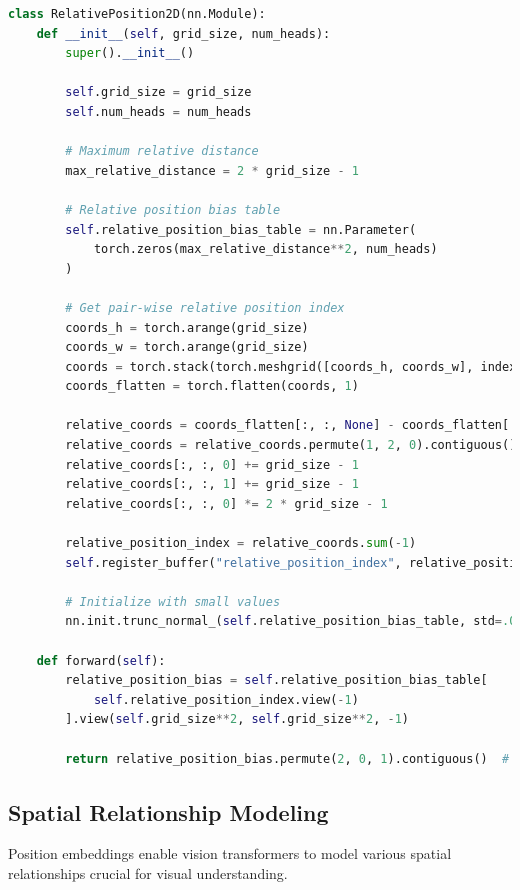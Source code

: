 \begin{lstlisting}[language=Python, caption=2D relative position embeddings]
class RelativePosition2D(nn.Module):
    def __init__(self, grid_size, num_heads):
        super().__init__()
        
        self.grid_size = grid_size
        self.num_heads = num_heads
        
        # Maximum relative distance
        max_relative_distance = 2 * grid_size - 1
        
        # Relative position bias table
        self.relative_position_bias_table = nn.Parameter(
            torch.zeros(max_relative_distance**2, num_heads)
        )
        
        # Get pair-wise relative position index
        coords_h = torch.arange(grid_size)
        coords_w = torch.arange(grid_size)
        coords = torch.stack(torch.meshgrid([coords_h, coords_w], indexing='ij'))
        coords_flatten = torch.flatten(coords, 1)
        
        relative_coords = coords_flatten[:, :, None] - coords_flatten[:, None, :]
        relative_coords = relative_coords.permute(1, 2, 0).contiguous()
        relative_coords[:, :, 0] += grid_size - 1
        relative_coords[:, :, 1] += grid_size - 1
        relative_coords[:, :, 0] *= 2 * grid_size - 1
        
        relative_position_index = relative_coords.sum(-1)
        self.register_buffer("relative_position_index", relative_position_index)
        
        # Initialize with small values
        nn.init.trunc_normal_(self.relative_position_bias_table, std=.02)
    
    def forward(self):
        relative_position_bias = self.relative_position_bias_table[
            self.relative_position_index.view(-1)
        ].view(self.grid_size**2, self.grid_size**2, -1)
        
        return relative_position_bias.permute(2, 0, 1).contiguous()  # [num_heads, N, N]
\end{lstlisting}

\subsection{Spatial Relationship Modeling}

Position embeddings enable vision transformers to model various spatial relationships crucial for visual understanding.

